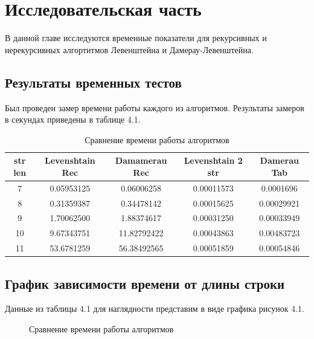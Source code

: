 \documentclass[12pt]{report}
\begin{document}
\chapter{Исследовательская часть}
В данной главе исследуются временные показатели для рекурсивных и нерекурсивных алгортитмов Левенштейна и Дамерау-Левенштейна.
\section{Результаты временных тестов} 
Был проведен замер времени работы каждого из алгоритмов. Результаты замеров в секундах приведены в таблице 4.1.
\begin{table}[h!]
	\begin{tabular}{|c|c|c|c|c|} 
 	\hline
	str len & Levenshtain Rec & Damamerau Rec & Levenshtain 2 str & Damerau Tab \\ [0.5ex] 
 	\hline\hline
 	7 & 0.05953125 & 0.06006258 & 0.00011573 & 0.0001696\\
 	\hline
 	8 & 0.31359387 & 0.34478142 & 0.00015625 & 0.00029921\\
 	\hline
	9 & 1.70062500 & 1.88374617 & 0.00031250 & 0.00033949\\
	\hline
	10 & 9.67343751 & 11.82792422 & 0.00043863 & 0.00483723\\
	\hline
	11 & 53.6781259 & 56.38492565 & 0.00051859 & 0.00054846\\
	\hline
	\end{tabular}
\caption{Сравнение времени работы алгоритмов}
\end{table}
\section{График зависимости времени от длины строки}
Данные из таблицы 4.1 для наглядности представим в виде графика рисунок 4.1.
\begin{figure}[h!]
\caption{Сравнение времени работы алгоритмов}
\end{figure}
\end{document}
